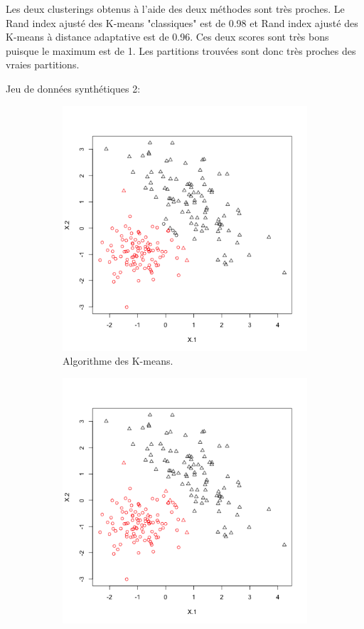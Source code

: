 \documentclass[a4paper,11pt,oneside,roman]{article}
\begin{document}
    Les deux clusterings obtenus à l'aide des deux méthodes sont très proches.
    Le Rand index ajusté des K-means "classiques" est de 0.98 et Rand index ajusté des K-means à distance adaptative est de 0.96.
    Ces deux scores sont très bons puisque le maximum est de 1. Les partitions trouvées sont donc très proches des vraies partitions.


    Jeu de données synthétiques 2:
    \begin{figure}
        \centering
        \begin{subfigure}{.5\textwidth}
          \centering
          \includegraphics[width=.8\linewidth]{imgs/K_means_synth_2.png}
          \caption{Algorithme des K-means.}
        \end{subfigure}%
        \begin{subfigure}{.5\textwidth}
          \centering
          \includegraphics[width=.8\linewidth]{imgs/K_means_adapt_synth_2.png}

\end{subfigure}
\end{figure}
\end{document}
